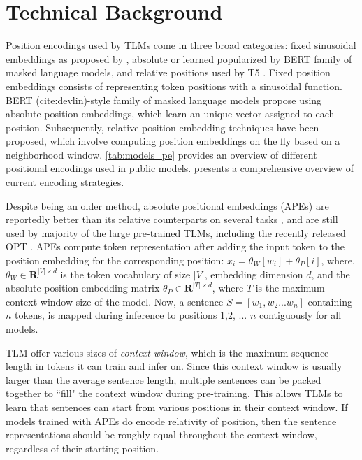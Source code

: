 \documentclass[letterpaper, 12pt]{report}
\begin{document}
\section{Technical Background}
\label{sec:pos_technical_bg}

Position encodings used by TLMs come in three broad categories: fixed sinusoidal embeddings as proposed by \citet{vaswani2017}, absolute or learned popularized by BERT \cite{Devlin2019:BERT} family of masked language models, and relative positions \citep{shaw-etal-2018-self} used by T5 \cite{Raffel2020:T5}.
Fixed position embeddings \cite{vaswani2017} consists of representing token positions with a sinusoidal function. BERT (cite:devlin)-style family of masked language models propose using absolute position embeddings, which learn an unique vector assigned to each position.
Subsequently, relative position embedding techniques have been proposed, which involve computing position embeddings on the fly based on a neighborhood window. \autoref{tab:models_pe} provides an overview of different positional encodings used in public models.
\citet{wang2021on} presents a comprehensive overview of current encoding strategies.




Despite being an older method, absolute positional embeddings (APEs) are reportedly better than its relative counterparts on several tasks \citep{ravishankar-etal-2021-multilingual}, and are still used by majority of the large pre-trained TLMs, including the recently released OPT \cite{Zhang2022:OPT}.
APEs compute token representation after adding the input token to the position embedding for the corresponding position: $x_i = \theta_{W}[w_i] + \theta_{P}[i]$,
where, $\theta_W \in \mathbf{R}^{|V| \times d}$ is the token vocabulary of size $|V|$, embedding dimension $d$, and the absolute position embedding matrix $\theta_P \in \mathbf{R}^{|T|\times d}$, where $T$ is the maximum context window size of the model.
Now, a sentence $S=[w_1,w_2 ... w_n]$ containing $n$ tokens, is mapped during inference to positions 1,2, ... $n$ contiguously for all models.

TLM offer various sizes of \textit{context window}, which is the maximum sequence length in tokens it can train and infer on.
Since this context window is usually larger than the average sentence length, multiple sentences can be packed together to ``fill" the context window during pre-training.
This allows TLMs to learn that sentences can start from various positions in their context window. If models trained with APEs do encode relativity of position, then the sentence representations should be roughly equal throughout the context window, regardless of their starting position.
\end{document}
